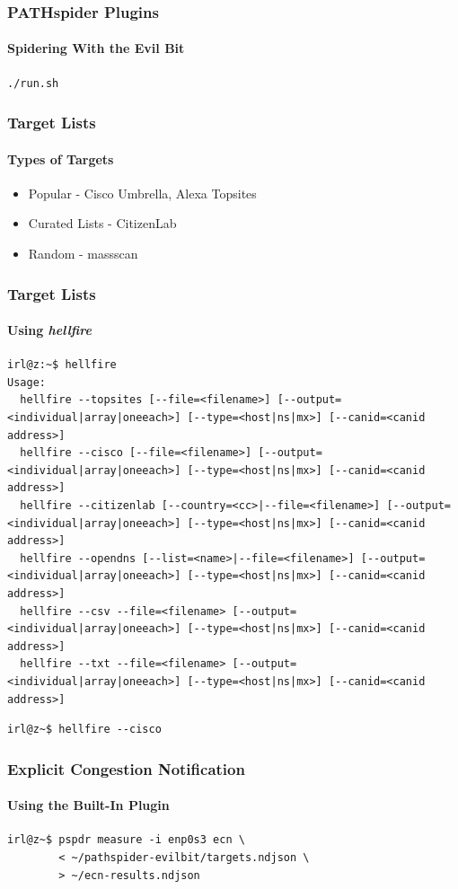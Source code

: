 \documentclass[handout,notes]{beamer}
\begin{document}
\begin{frame}[fragile]
\frametitle{PATHspider Plugins}
\framesubtitle{Spidering With the Evil Bit}
\begin{lstlisting}[caption={Running the Evil Bit Plugin}]
./run.sh
\end{lstlisting}
\end{frame}

\begin{frame}
\frametitle{Target Lists}
\framesubtitle{Types of Targets}
\begin{itemize}
\item{Popular - Cisco Umbrella, Alexa Topsites}
\item{Curated Lists - CitizenLab}
\item{Random - massscan}
\end{itemize}
\end{frame}

\begin{frame}[fragile]
\frametitle{Target Lists}
\framesubtitle{Using \textit{hellfire}}
\begin{lstlisting}[caption={\textit{hellfire}'s Usage Help}]
irl@z:~$ hellfire
Usage:
  hellfire --topsites [--file=<filename>] [--output=<individual|array|oneeach>] [--type=<host|ns|mx>] [--canid=<canid address>]
  hellfire --cisco [--file=<filename>] [--output=<individual|array|oneeach>] [--type=<host|ns|mx>] [--canid=<canid address>]
  hellfire --citizenlab [--country=<cc>|--file=<filename>] [--output=<individual|array|oneeach>] [--type=<host|ns|mx>] [--canid=<canid address>]
  hellfire --opendns [--list=<name>|--file=<filename>] [--output=<individual|array|oneeach>] [--type=<host|ns|mx>] [--canid=<canid address>]
  hellfire --csv --file=<filename> [--output=<individual|array|oneeach>] [--type=<host|ns|mx>] [--canid=<canid address>]
  hellfire --txt --file=<filename> [--output=<individual|array|oneeach>] [--type=<host|ns|mx>] [--canid=<canid address>]
\end{lstlisting}
\begin{lstlisting}[caption={Start Resolving the Cisco Umbrella List}]
irl@z~$ hellfire --cisco
\end{lstlisting}
\end{frame}

\begin{frame}[fragile]
\frametitle{Explicit Congestion Notification}
\framesubtitle{Using the Built-In Plugin}
\begin{lstlisting}[caption={Start Resolving the Cisco Umbrella List}]
irl@z~$ pspdr measure -i enp0s3 ecn \
        < ~/pathspider-evilbit/targets.ndjson \
        > ~/ecn-results.ndjson
\end{lstlisting}
\end{frame}
\end{document}

